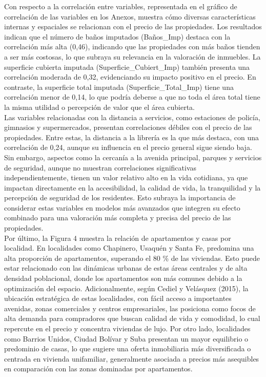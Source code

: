 \documentclass[a4paper]{article}
\theoremstyle{remark}
\theoremstyle{definition}
\begin{document}
Con respecto a la correlación entre variables, representada en el gráfico de correlación de las variables en los Anexos, muestra cómo diversas características internas y espaciales se relacionan con el precio de las propiedades. Los resultados indican que el número de baños imputados (Baños\_Imp) destaca con la correlación más alta (0,46), indicando que las propiedades con más baños tienden a ser más costosas, lo que subraya su relevancia en la valoración de inmuebles. La superficie cubierta imputada (Superficie\_Cubiert\_Imp) también presenta una correlación moderada de 0,32, evidenciando su impacto positivo en el precio. En contraste, la superficie total imputada (Superficie\_Total\_Imp) tiene una correlación menor de 0,14, lo que podría deberse a que no toda el área total tiene la misma utilidad o percepción de valor que el área cubierta.\\

Las variables relacionadas con la distancia a servicios, como estaciones de policía, gimnasios y supermercados, presentan correlaciones débiles con el precio de las propiedades. Entre estas, la distancia a la librería es la que más destaca, con una correlación de 0,24, aunque su influencia en el precio general sigue siendo baja. Sin embargo, aspectos como la cercanía a la avenida principal, parques y servicios de seguridad, aunque no muestran correlaciones significativas independientemente, tienen un valor relativo alto en la vida cotidiana, ya que impactan directamente en la accesibilidad, la calidad de vida, la tranquilidad y la percepción de seguridad de los residentes. Esto subraya la importancia de considerar estas variables en modelos más avanzados que integren su efecto combinado para una valoración más completa y precisa del precio de las propiedades.\\

Por último, la Figura 4 muestra la relación de apartamentos y casas por localidad. En localidades como Chapinero, Usaquén y Santa Fe, predomina una alta proporción de apartamentos, superando el 80 \% de las viviendas. Esto puede estar relacionado con las dinámicas urbanas de estas áreas centrales y de alta densidad poblacional, donde los apartamentos son más comunes debido a la optimización del espacio. Adicionalmente, según Cediel y Velásquez (2015), la ubicación estratégica de estas localidades, con fácil acceso a importantes avenidas, zonas comerciales y centros empresariales, las posiciona como focos de alta demanda para compradores que buscan calidad de vida y comodidad, lo cual repercute en el precio y concentra viviendas de lujo. Por otro lado, localidades como Barrios Unidos, Ciudad Bolívar y Suba presentan un mayor equilibrio o predominio de casas, lo que sugiere una oferta inmobiliaria más diversificada o centrada en vivienda unifamiliar, generalmente asociada a precios más asequibles en comparación con las zonas dominadas por apartamentos.
\end{document}
